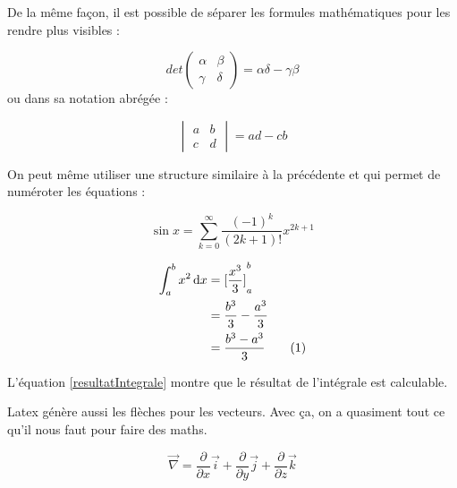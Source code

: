 \documentclass[10pt,a4paper]{report} %
\newcommand\numberthis{\addtocounter{equation}{1}\tag{\theequation}} %
\begin{document}

De la même façon, il est possible de séparer les formules mathématiques pour les rendre plus visibles :


\begin{displaymath}
	det \begin{pmatrix}
	\alpha & \beta \\
	\gamma & \delta
	\end{pmatrix} = \alpha\delta - \gamma\beta 
\end{displaymath} ou dans sa notation abrégée : 

$$
\begin{vmatrix} 
	a & b \\
	c & d 
\end{vmatrix} = ad - cb
$$

On peut même utiliser une structure similaire à la précédente et qui permet de numéroter les équations :

\begin{equation}
\sin x=\sum_{k=0}^{\infty}\frac{(-1)^k}{(2k+1)!}x^{2k+1}
\end{equation}

\begin{align*}
	\int_a^b x^2 \, \mathrm dx & = {\lbrack \frac{x^3}{3} \rbrack}_a^b                     \\
	                           & = \frac{b^3}{3} - \frac{a^3}{3}                           \\
	                           & = \frac{b^3-a^3}{3} \numberthis \label{resultatIntegrale} 
\end{align*}

L'équation \eqref{resultatIntegrale} montre que le résultat de l'intégrale est calculable.

Latex génère aussi les flèches pour les vecteurs. Avec ça, on a quasiment tout ce qu'il nous faut pour faire des maths.

$$
\overrightarrow{\nabla }=\frac{\partial }{\partial x}\overrightarrow{i}+\frac{\partial }{\partial y}\overrightarrow{j}+\frac{\partial }{\partial z}
\overrightarrow{k}
$$
\end{document}

